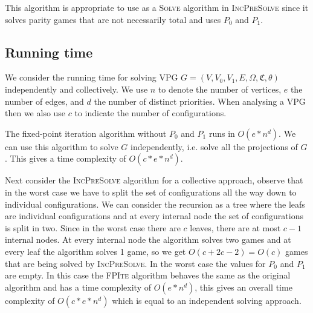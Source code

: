 This algorithm is appropriate to use as a \textsc{Solve} algorithm in \textsc{IncPreSolve} since it solves parity games that are not necessarily total and uses $P_0$ and $P_1$.

\subsection{Running time}
We consider the running time for solving VPG $G = (V,V_0,V_1,E,\Omega,\mathfrak{C},\theta)$ independently and collectively. We use $n$ to denote the number of vertices, $e$ the number of edges, and $d$ the number of distinct priorities. When analysing a VPG then we also use $c$ to indicate the number of configurations.

The fixed-point iteration algorithm without $P_0$ and $P_1$ runs in $O(e*n^d)$. We can use this algorithm to solve $G$ independently, i.e. solve all the projections of $G$. This gives a time complexity of $O(c*e*n^d)$.

Next consider the \textsc{IncPreSolve} algorithm for a collective approach, observe that in the worst case we have to split the set of configurations all the way down to individual configurations. We can consider the recursion as a tree where the leafs are individual configurations and at every internal node the set of configurations is split in two. Since in the worst case there are $c$ leaves, there are at most $c-1$ internal nodes. At every internal node the algorithm solves two games and at every leaf the algorithm solves 1 game, so we get $O(c + 2c - 2) = O(c)$ games that are being solved by \textsc{IncPreSolve}. In the worst case the values for $P_0$ and $P_1$ are empty. In this case the \textsc{FPIte} algorithm behaves the same as the original algorithm and has a time complexity of $O(e*n^d)$, this gives an overall time complexity of $O(c*e*n^d)$ which is equal to an independent solving approach.
